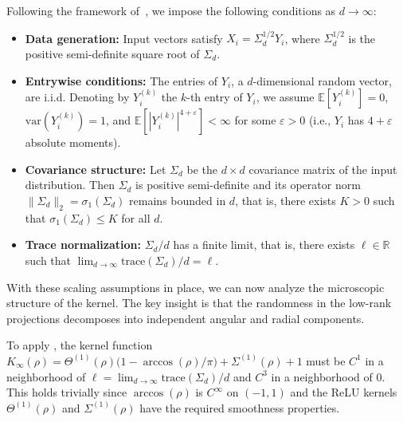\begin{assumption}\label{assump:RMT-conditions}
Following the framework of~\cite{El_Karoui_2010}, we impose the following conditions  as \( d \to \infty \):
\begin{itemize}
    
    \item[(d)] \textbf{Data generation:} Input vectors satisfy \( X_i = \Sigma_d^{1/2} Y_i \), where \( \Sigma_d^{1/2} \) is the positive semi-definite square root of \( \Sigma_d \).
    
    \item[(e)] \textbf{Entrywise conditions:} The entries of \( Y_i \), a \( d \)-dimensional random vector, are i.i.d. Denoting by \( Y_i^{(k)} \) the \( k \)-th entry of \( Y_i \), we assume \( \mathbb{E}[Y_i^{(k)}] = 0 \), \( \mathrm{var}(Y_i^{(k)}) = 1 \), and \( \mathbb{E}[|Y_i^{(k)}|^{4+\varepsilon}] < \infty \) for some \( \varepsilon > 0 \) (i.e., \( Y_i \) has \( 4+\varepsilon \) absolute moments).
    
    \item[(b)] \textbf{Covariance structure:} Let \( \Sigma_d \) be the \( d \times d \) covariance matrix of the input distribution. Then \( \Sigma_d \) is positive semi-definite and its operator norm \( \|\Sigma_d\|_2 = \sigma_1(\Sigma_d) \) remains bounded in \( d \), that is, there exists \( K > 0 \) such that \( \sigma_1(\Sigma_d) \leq K \) for all \( d \).
    
    \item[(c)] \textbf{Trace normalization:} \( \Sigma_d/d \) has a finite limit, that is, there exists \( \ell \in \mathbb{R} \) such that \( \lim_{d\to\infty} \mathrm{trace}(\Sigma_d)/d = \ell \).
    \end{itemize}
\end{assumption}

With these scaling assumptions in place, we can now analyze the microscopic structure of the kernel. The key insight is that the randomness in the low-rank projections decomposes into independent angular and radial components.

To apply \cite{El_Karoui_2010}, the kernel function \( K_{\infty}(\rho) = \Theta^{(1)}(\rho)\big(1-\arccos(\rho)/\pi\big) + \Sigma^{(1)}(\rho) + 1 \) must be \( C^1 \) in a neighborhood of \( \ell = \lim_{d\to\infty} \mathrm{trace}(\Sigma_d)/d \) and \( C^3 \) in a neighborhood of \( 0 \). This holds trivially since \( \arccos(\rho) \) is \( C^\infty \) on \( (-1,1) \) and the ReLU kernels \( \Theta^{(1)}(\rho) \) and \( \Sigma^{(1)}(\rho) \) have the required smoothness properties.

